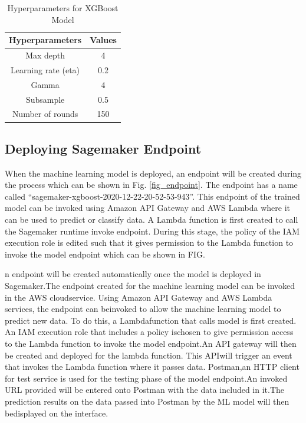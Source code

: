 \begin{table}[ht]
\centering
\begin{center}
\begin{tabular}{ |c|c| } 
  \hline
Hyperparameters  & Values\\ 
  \hline\hline
Max depth & 4\\ 
Learning rate (eta) & 0.2\\ 
Gamma & 4\\ 
Subsample & 0.5\\ 
Number of rounds & 150\\ 


 \hline
\end{tabular}
\caption{Hyperparameters for XGBoost Model}
\label{table:xg}
\end{center}
\end{table}

\subsection{Deploying Sagemaker Endpoint} 
When the machine learning model is deployed, an endpoint will be created during the process which can be shown in Fig. \ref{fig_endpoint}. The endpoint has a name called ``sagemaker-xgboost-2020-12-22-20-52-53-943''. This endpoint of the trained model can be invoked using Amazon API Gateway and AWS Lambda where it can be used to predict or classify data. A Lambda function is first created to call the Sagemaker runtime invoke endpoint. During this stage, the policy of the IAM execution role is edited such that it gives permission to the Lambda function to invoke the model endpoint which can be shown in FIG.


n  endpoint  will  be  created  automatically  once  the  model  is  deployed  in  Sagemaker.The endpoint created for the machine learning model can be invoked in the AWS cloudservice.  Using Amazon API Gateway and AWS Lambda services, the endpoint can beinvoked to allow the machine learning model to predict new data.  To do this, a Lambdafunction that calls model is first created.  An IAM execution role that includes a policy ischosen to give permission access to the Lambda function to invoke the model endpoint.An API gateway will then be created and deployed for the lambda function.  This APIwill trigger an event that invokes the Lambda function where it passes data.  Postman,an  HTTP  client  for  test  service  is  used  for  the  testing  phase  of  the  model  endpoint.An invoked URL provided will be entered onto Postman with the data included in it.The prediction results on the data passed into Postman by the ML model will then bedisplayed on the interface.

